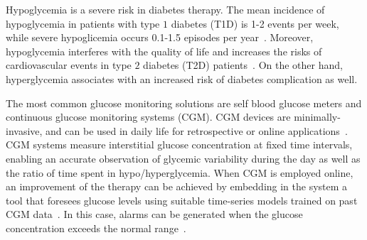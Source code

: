 Hypoglycemia is a severe risk in diabetes therapy. 
The mean incidence of hypoglycemia in patients with type $1$ diabetes (T1D) 
is 1-2 events per week, while severe hypoglicemia occurs 0.1-1.5 episodes per year~\cite{van2016continuous}. 
Moreover, hypoglycemia interferes with the quality of life and increases the risks of cardiovascular events in type $2$ diabetes (T2D) patients~\cite{van2016continuous}. On the other hand, hyperglycemia associates with an increased risk of diabetes complication as well.


The most common glucose monitoring solutions are self blood glucose meters and continuous glucose monitoring systems (CGM). 
CGM devices are minimally-invasive, and can be used in daily life for retrospective or online applications~\cite{vigersky2017role}. 
CGM systems measure interstitial glucose concentration at fixed time intervals, enabling an accurate observation of glycemic variability during the day as well as the ratio of time spent in hypo/hyperglycemia. 
When CGM is employed online, an improvement of the therapy can be achieved by embedding in the system a tool that foresees glucose levels using suitable time-series models trained on past  CGM  data~\cite{sparacino2007glucose}. In this case, alarms can be generated when the glucose concentration exceeds the normal range~\cite{vigersky2017role}.

%
%
%
%
%

